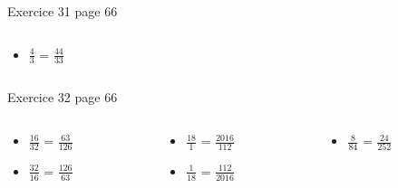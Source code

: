 \documentclass[xcolor={dvipsnames}, handout]{beamer}
\begin{document}
\begin{frame}
\begin{block}{Exercice 31 page 66}
\begin{columns}
		\begin{column}{0.25\textwidth}
			\begin{huge}
				\begin{itemize}
					
					\item $\frac{4}{3}$ = \pause $\frac{44}{33}$\pause					
				\end{itemize}	
			\end{huge}
			
		\end{column}
	\end{columns}		
	
	\end{block}	


	\begin{block}{Exercice 32 page 66}
		\begin{columns}
			\begin{column}{0.25\textwidth}
				\begin{LARGE}
					\begin{itemize}
						\setlength\itemsep{1em}
						\item $\frac{16}{32}$ =  $\frac{63}{126}$ \pause
						
						\item $\frac{32}{16}$ =  $\frac{126}{63}$ \pause
						
						
					\end{itemize}	
				\end{LARGE}
				
			\end{column}
			
			\begin{column}{0.25\textwidth}
				\begin{LARGE}
					\begin{itemize}
						\setlength\itemsep{1em}
						\item $\frac{18}{1}$ = $\frac{2016}{112}$ 
						
						\item $\frac{1}{18}$ = $\frac{112}{2016}$ \pause
						
						
						
					\end{itemize}	
				\end{LARGE}
				
			\end{column}
			
			\begin{column}{0.25\textwidth}
				\begin{LARGE}
					\begin{itemize}
						\setlength\itemsep{1em}
						\item $\frac{8}{84}$ = $\frac{24}{252}$
						

\end{itemize}
\end{LARGE}
\end{column}
\end{columns}
\end{block}
\end{frame}
\end{document}
